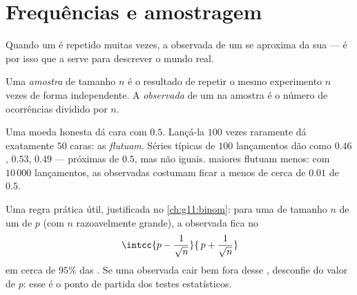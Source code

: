 \section{Frequências e amostragem}

Quando um  é repetido muitas vezes, a 
observada de um  se aproxima da sua  --- é por isso
que a  serve para descrever o mundo real.

\begin{definition}[Amostra]\label{def:g10:proba:sample}
Uma \emph{amostra} de tamanho $n$ é o resultado de repetir
o mesmo experimento $n$ vezes de forma independente. A \emph{
observada} de um  na amostra é o número de ocorrências dividido por
$n$.
\end{definition}

\begin{example}\label{ex:g10:proba:sampling}
Uma moeda honesta dá cara com  $0.5$. Lançá-la $100$ vezes
raramente dá exatamente $50$ caras: as  \emph{flutuam}. Séries
típicas de $100$ lançamentos dão  como $0.46$, $0.53$, $0.49$
--- próximas de $0.5$, mas não iguais.  maiores flutuam menos:
com $10\,000$ lançamentos, as  observadas costumam ficar a
menos de cerca de $0.01$ de $0.5$.
\end{example}

\begin{remark}
Uma regra prática útil, justificada no \cref{ch:g11:binom}: para uma
 de tamanho $n$ de um  de  $p$ (com $n$
razoavelmente grande), a  observada fica no 
\[
\intcc{p - \frac{1}{\sqrt n}}{\,p + \frac{1}{\sqrt n}}
\]
em cerca de $95\%$ das . Se uma  observada cair bem
fora desse , desconfie do valor de $p$: esse é o ponto de
partida dos testes estatísticos.
\end{remark}

